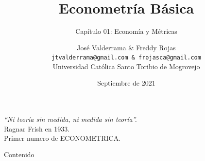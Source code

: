 \documentclass{beamer}
\title[Capítulo 01]{Econometría Básica}
\subtitle{Capítulo 01: Economía y Métricas}
\author[José Valderrama \& Freddy Rojas]{José Valderrama \& Freddy Rojas \\
	\texttt{jtvalderrama@gmail.com \& frojasca@gmail.com} \faIcon{envelope} \\
		Universidad Católica Santo Toribio de Mogrovejo}
\date[Septiembre de 2021]{Septiembre de 2021}
\begin{document}
	\rmfamily
		\begin{frame}
			\maketitle
		\end{frame}
	\begin{frame}
		\centering
		\vspace{2cm}
			\emph{\textit {``Ni teoría sin medida, ni medida sin teoría''.}} \\
		\vspace{2cm}
		\flushright
			Ragnar Frish en 1933. \\
			Primer numero de ECONOMETRICA.
	\end{frame}
	\begin{frame}{Contenido}
		\tableofcontents
	\end{frame}

	
	
	
	

	\begin{frame}
		\maketitle
	\end{frame}
\end{document}
